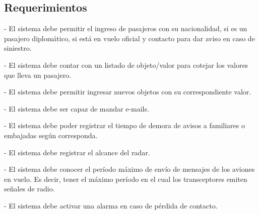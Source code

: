 		
\subsection{Requerimientos}
- El sistema debe permitir el ingreso de pasajeros con su nacionalidad, si es un pasajero diplomático, 
si está en vuelo oficial y contacto para dar aviso en caso de siniestro.

- El sistema debe contar con un listado de objeto/valor para cotejar los valores que lleva un pasajero.

- El sistema debe permitir ingresar nuevos objetos con su correspondiente valor.

- El sistema debe ser capaz de mandar e-mails.

- El sistema debe poder registrar el tiempo de demora de avisos a familiares o embajadas según corresponda.

- El sistema debe registrar el alcance del radar.

- El sistema debe conocer el período máximo de envío de mensajes de los aviones en vuelo. Es decir, tener el
máximo período en el cual los transceptores emiten señales de radio.

- El sistema debe activar una alarma en caso de pérdida de contacto.
